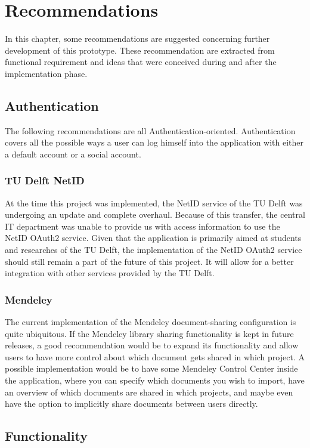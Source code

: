 \chapter{Recommendations}

In this chapter, some recommendations are suggested concerning further development of this prototype. These recommendation are extracted from functional requirement and ideas that were conceived during and after the implementation phase.

\section{Authentication}

The following recommendations are all Authentication-oriented. Authentication covers all the possible ways a user can log himself into the application with either a default account or a social account.

\subsection{TU Delft NetID}
At the time this project was implemented, the NetID service of the TU Delft was undergoing an update and complete overhaul. Because of this transfer, the central IT department was unable to provide us with access information to use the NetID OAuth2 service. Given that the application is primarily aimed at students and researches of the TU Delft, the implementation of the NetID OAuth2 service should still remain a part of the future of this project. It will allow for a better integration with other services provided by the TU Delft.

\subsection{Mendeley}
The current implementation of the Mendeley document-sharing configuration is quite ubiquitous. If the Mendeley library sharing functionality is kept in future releases, a good recommendation would be to expand its functionality and allow users to have more control about which document gets shared in which project. A possible implementation would be to have some Mendeley Control Center inside the application, where you can specify which documents you wish to import, have an overview of which documents are shared in which projects, and maybe even have the option to implicitly share documents between users directly.

\section{Functionality}

